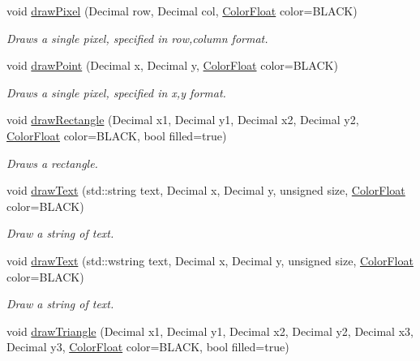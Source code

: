 \begin{DoxyCompactItemize}
void \hyperlink{classtsgl_1_1_cartesian_canvas_ad0bdf8651a9f703cfd6f71a6bd6ffe17}{draw\-Pixel} (Decimal row, Decimal col, \hyperlink{structtsgl_1_1_color_float}{Color\-Float} color=B\-L\-A\-C\-K)
\begin{DoxyCompactList}\small\item\em Draws a single pixel, specified in row,column format. \end{DoxyCompactList}\item 
void \hyperlink{classtsgl_1_1_cartesian_canvas_a2ef932501dd03f885fd0ff30ddffae01}{draw\-Point} (Decimal x, Decimal y, \hyperlink{structtsgl_1_1_color_float}{Color\-Float} color=B\-L\-A\-C\-K)
\begin{DoxyCompactList}\small\item\em Draws a single pixel, specified in x,y format. \end{DoxyCompactList}\item 
void \hyperlink{classtsgl_1_1_cartesian_canvas_a5e88e7d751e24ae78d158f1d8e9faf5e}{draw\-Rectangle} (Decimal x1, Decimal y1, Decimal x2, Decimal y2, \hyperlink{structtsgl_1_1_color_float}{Color\-Float} color=B\-L\-A\-C\-K, bool filled=true)
\begin{DoxyCompactList}\small\item\em Draws a rectangle. \end{DoxyCompactList}\item 
void \hyperlink{classtsgl_1_1_cartesian_canvas_a7df01e80ce99d0ce6b45532034c0940c}{draw\-Text} (std\-::string text, Decimal x, Decimal y, unsigned size, \hyperlink{structtsgl_1_1_color_float}{Color\-Float} color=B\-L\-A\-C\-K)
\begin{DoxyCompactList}\small\item\em Draw a string of text. \end{DoxyCompactList}\item 
void \hyperlink{classtsgl_1_1_cartesian_canvas_addacb4d3637bf2674e2a992a0c165160}{draw\-Text} (std\-::wstring text, Decimal x, Decimal y, unsigned size, \hyperlink{structtsgl_1_1_color_float}{Color\-Float} color=B\-L\-A\-C\-K)
\begin{DoxyCompactList}\small\item\em Draw a string of text. \end{DoxyCompactList}\item 
void \hyperlink{classtsgl_1_1_cartesian_canvas_a67c225592f9416de476943bb93309cd1}{draw\-Triangle} (Decimal x1, Decimal y1, Decimal x2, Decimal y2, Decimal x3, Decimal y3, \hyperlink{structtsgl_1_1_color_float}{Color\-Float} color=B\-L\-A\-C\-K, bool filled=true)

\end{DoxyCompactItemize}
